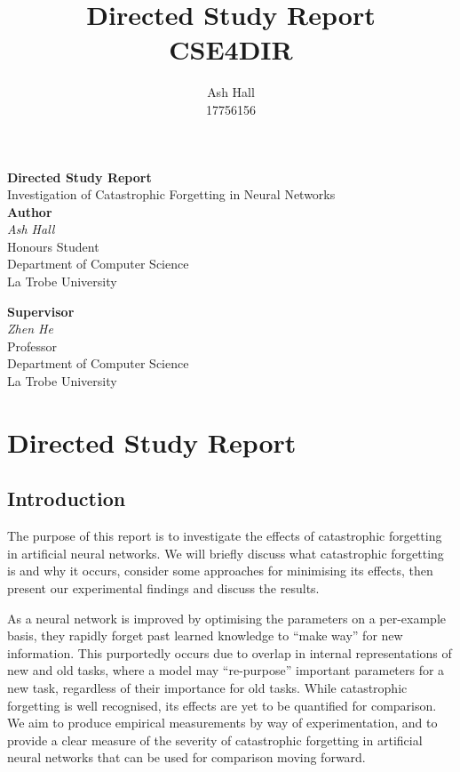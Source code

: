 \documentclass{report}
\title{Directed Study Report\\CSE4DIR}
\author{Ash Hall\\17756156}
\begin{document}
	\begin{titlepage}
		\begin{center}
			\vspace*{5cm}
			{\huge \textbf{Directed Study Report}} \\
			\vspace{0.3cm}
			{\large Investigation of Catastrophic Forgetting in Neural Networks} \\
			\vspace*{2cm}
			\textbf{Author} \\
			\textit{Ash Hall} \\
			Honours Student \\
			Department of Computer Science \\
			La Trobe University \\		
			\vspace{0.75cm}
			
			\textbf{Supervisor} \\
			\textit{Zhen He} \\
			Professor \\
			Department of Computer Science \\
			La Trobe University \\
			
			
			\vfill
		\end{center}
	\end{titlepage}
	\thispagestyle{empty}
	\newpage
	\thispagestyle{empty}
	\tableofcontents
	\thispagestyle{empty}
	\listoffigures
	\newpage
	\thispagestyle{empty}
	\newpage
	
	\setcounter{chapter}{1}	
	\chapter*{Directed Study Report}

	\section{Introduction}
	The purpose of this report is to investigate the effects of catastrophic forgetting in artificial neural networks. We will briefly discuss what catastrophic forgetting is and why it occurs, consider some approaches for minimising its effects, then present our experimental findings and discuss the results. \par \par
	As a neural network is improved by optimising the parameters on a per-example basis, they rapidly forget past learned knowledge to ``make way'' for new information. This purportedly occurs due to overlap in internal representations of new and old tasks, where a model may ``re-purpose'' important parameters for a new task, regardless of their importance for old tasks. While catastrophic forgetting is well recognised, its effects are yet to be quantified for comparison. We aim to produce empirical measurements by way of experimentation, and to provide a clear measure of the severity of catastrophic forgetting in artificial neural networks that can be used for comparison moving forward. \par
	
\end{document}
